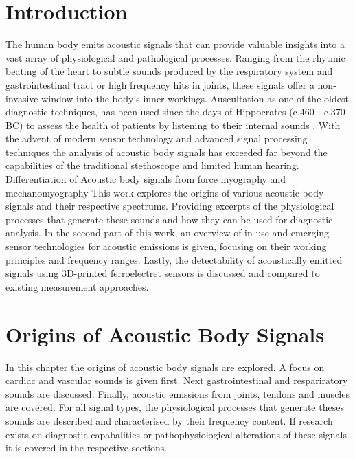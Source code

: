 \documentclass[
	ngerman,
	ruledheaders=section,%
	class=report,%
	thesis={type=report},%
	accentcolor=1c,%
	custommargins=false,%
	marginpar=false,%
	BCOR=5mm,%
	parskip=half-,%
	fontsize=11pt,%
]{tudapub}
\begin{document}
\chapter{Introduction}
The human body emits acoustic signals that can provide valuable insights into a vast array of physiological
and pathological processes. Ranging from the rhytmic beating of the heart to subtle sounds produced
by the respiratory system and gastrointestinal tract or high frequency hits in joints, these signals offer a
non-invasive window into the body’s inner workings. Auscultation as one of the oldest diagnostic techniques,
has been used since the days of Hippocrates (c.460 - c.370 BC) to assess the health of patients by listening
to their internal sounds \cite{montinari_first_2019}. With the advent of modern sensor technology and advanced signal processing
techniques the analysis of acoustic body signals has exceeded far beyond the capabilities of the traditional
stethoscope and limited human hearing.
\\Differentiation of Acoustic body signals from force myography and mechanomyography 
This work explores the origins of various acoustic body signals and their respective spectrums. Providing
excerpts of the physiological processes that generate these sounds and how they can be used for diagnostic
analysis.
In the second part of this work, an overview of in use and emerging sensor technologies for acoustic
emissions is given, focusing on their working principles and frequency ranges. Lastly, the detectability of
acoustically emitted signals using 3D-printed ferroelectret sensors is discussed and compared to existing
measurement approaches.



\chapter{Origins of Acoustic Body Signals}
In this chapter the origins of acoustic body signals are explored. A focus on cardiac and vascular sounds is given first. 
Next gastrointestinal and respariratory sounds are discussed. Finally, acoustic emissions from joints, tendons and muscles are covered.
For all signal types, the physiological processes that generate theses sounds are described and characterised by their frequency content. 
If research exists on diagnostic capabalities or pathophysiological alterations of these signals it is covered in the respective sections. 
\end{document}
